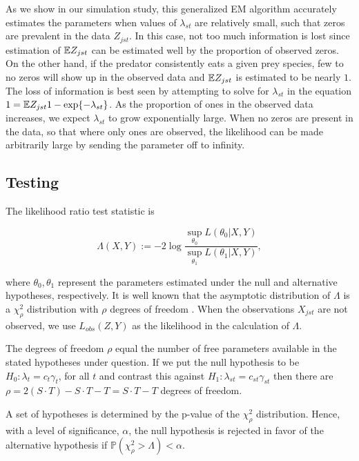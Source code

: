 As we show in our simulation study, this generalized EM algorithm accurately estimates the parameters when values of $\lambda_{st}$ are relatively small, such that zeros are prevalent in the data $Z_{jst}$.  In this case, not too much information is lost since estimation of $\mathbb{E} Z_{jst}$ can be estimated well by the proportion of observed zeros.  On the other hand, if the predator consistently eats a given prey species, few to no zeros will show up in the observed data and $\mathbb{E} Z_{jst}$ is estimated to be nearly $1$.  The loss of information is best seen by attempting to solve for $\lambda_{st}$ in the equation $1 = \mathbb{E} Z_{jst} 1 - \exp\{-\lambda_{st}\}$.  As the proportion of ones in the observed data increases, we expect $\lambda_{st}$ to grow exponentially large.  When no zeros are present in the data, so that where only ones are observed, the likelihood can be made arbitrarily large by sending the parameter off to infinity.  

\subsection{Testing}

The likelihood ratio test statistic is

\begin{equation*}
  \label{eq:LRT}
    \Lambda(X,Y) := -2 \log{ \frac{ \sup_{\theta_0} L(\theta_0|X,Y)}{ \sup_{\theta_1} L(\theta_1|X,Y)} },
\end{equation*}

\noindent where $\theta_0, \theta_1$ represent the parameters estimated under the null and alternative hypotheses, respectively.  It is well known that the asymptotic distribution of $\Lambda$ is a $\chi_{\rho}^2$ distribution with $\rho$ degrees of freedom \citep{Wilks:1938}.  When the observations $X_{jst}$ are not observed, we use $L_{obs}(Z,Y)$ as the likelihood in the calculation of $\Lambda$.  

The degrees of freedom $\rho$ equal the number of free parameters available in the stated hypotheses under question.  If we put the null hypothesis to be $H_0: \lambda_t = c_t \gamma_t$, for all $t$ and contrast this against $H_1: \lambda_{st} = c_{st}\gamma_{st}$ then there are $\rho = 2(S \cdot T) - S \cdot T - T = S \cdot T - T$ degrees of freedom.

A set of hypotheses is determined by the p-value of the $\chi^2_{\rho}$ distribution.  Hence, with a level of significance, $\alpha$, the null hypothesis is rejected in favor of the alternative hypothesis if $\mathbb{P}(\chi^2_{\rho} > \Lambda) < \alpha$.  

